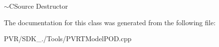  $\sim$\+C\+Source  Destructor 

The documentation for this class was generated from the following file\+:\begin{DoxyCompactItemize}
\item 
P\+V\+R/\+S\+D\+K\+\_./\+Tools/P\+V\+R\+T\+Model\+P\+O\+D.\+cpp\end{DoxyCompactItemize}
